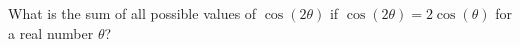 What is the sum of all possible values of $\cos\left(2\theta\right)$ if $\cos\left(2\theta\right)=2\cos\left(\theta\right)$ for a real number $\theta$?